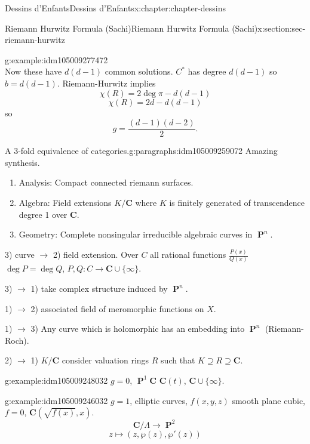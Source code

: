 \documentclass[oneside,10pt,]{book}
\numberwithin{equation}{section}
\newcommand{\CC}{\mathbf{C}}
\DeclareMathOperator{\PP}{\mathbf{P}}
\begin{document}
\begin{chapterptx}{Dessins d'Enfants}{}{Dessins d'Enfants}{}{}{x:chapter:chapter-dessins}
\begin{sectionptx}{Riemann Hurwitz Formula (Sachi)}{}{Riemann Hurwitz Formula (Sachi)}{}{}{x:section:sec-riemann-hurwitz}
\begin{example}{}{g:example:idm105009277472}
\begin{equation*}
\end{equation*}
Now these have \(d(d-1)\) common solutions. \(C^*\) has degree \(d(d-1)\) so \(b = d(d-1)\). Riemann-Hurwitz implies%
\begin{equation*}
\chi(R) = 2\deg \pi - d(d-1)
\end{equation*}
%
\begin{equation*}
\chi(R) = 2d - d(d-1)
\end{equation*}
so%
\begin{equation*}
g=  \frac{(d-1)(d-2)}{2}\text{.}
\end{equation*}
%
\end{example}
\begin{paragraphs}{A 3-fold equivalence of categories.}{g:paragraphs:idm105009259072}%
Amazing synthesis.%
\begin{enumerate}
\item{}Analysis: Compact connected riemann surfaces.%
\item{}Algebra: Field extensions \(K/\CC\) where \(K\) is finitely generated of transcendence degree 1 over \(\CC\).%
\item{}Geometry: Complete nonsingular irreducible algebraic curves in \(\PP^n\).%
\end{enumerate}
%
\par
3) curve \(\to\) 2) field extension. Over \(C\) all rational functions \(\frac{P(x)}{Q(x)}\) \(\deg P= \deg Q\), \(P,Q \colon C\to \CC \cup \{\infty\}\).%
\par
3) \(\to\) 1) take complex structure induced by \(\PP^n\).%
\par
1) \(\to\) 2) associated field of meromorphic functions on \(X\).%
\par
1) \(\to\) 3) Any curve which is holomorphic has an embedding into \(\PP^n\) (Riemann-Roch).%
\par
2) \(\to\) 1) \(K/\CC\) consider valuation rings \(R\) such that \(K\supseteq R\supseteq \CC\).%
\begin{example}{}{g:example:idm105009248032}%
\(g =0\), \(\PP^1 \CC\) \(\CC(t)\), \(\CC\cup \{\infty\}\).%
\end{example}
\begin{example}{}{g:example:idm105009246032}%
\(g =1\), elliptic curves, \(f(x,y,z)\) smooth plane cubic, \(f= 0\), \(\CC(\sqrt{f(x)}, x)\).%
\begin{equation*}
\CC/\Lambda \to \PP^2
\end{equation*}
%
\begin{equation*}
z\mapsto (z,\wp(z), \wp'(z))

\end{equation*}
\end{example}
\end{paragraphs}
\end{sectionptx}
\end{chapterptx}
\end{document}
